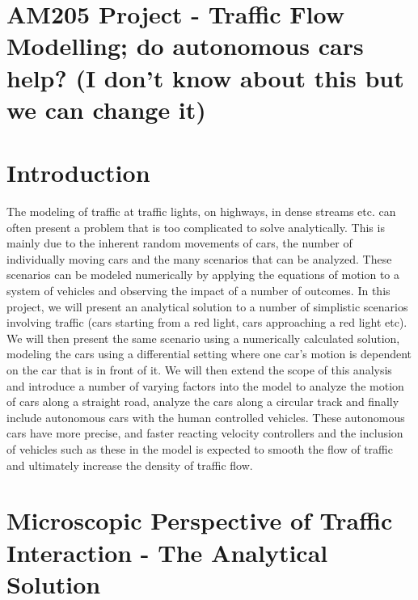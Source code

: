 \documentclass[11pt]{article}
\begin{document}
\lstset{language=Python, basicstyle=\scriptsize} %

\section*{AM205 Project - Traffic Flow Modelling; do autonomous cars help? (I don't know about this but we can change it)}

\section{Introduction}
The modeling of traffic at traffic lights, on highways, in dense streams etc. can often present a problem that is too complicated to solve analytically. This is mainly due to the inherent random movements of cars, the number of individually moving cars and the many scenarios that can be analyzed. These scenarios can be modeled numerically by applying the equations of motion to a system of vehicles and observing the impact of a number of outcomes. In this project, we will present an analytical solution to a number of simplistic scenarios involving traffic (cars starting from a red light, cars approaching a red light etc). We will then present the same scenario using a numerically calculated solution, modeling the cars using a differential setting where one car's motion is dependent on the car that is in front of it. We will then extend the scope of this analysis and introduce a number of varying factors into the model to analyze the motion of cars along a straight road, analyze the cars along a circular track and finally include autonomous cars with the human controlled vehicles. These autonomous cars have more precise, and faster reacting velocity controllers and the inclusion of vehicles such as these in the model is expected to smooth the flow of traffic and ultimately increase the density of traffic flow.

\section{Microscopic Perspective of Traffic Interaction - The Analytical Solution}
\end{document}
